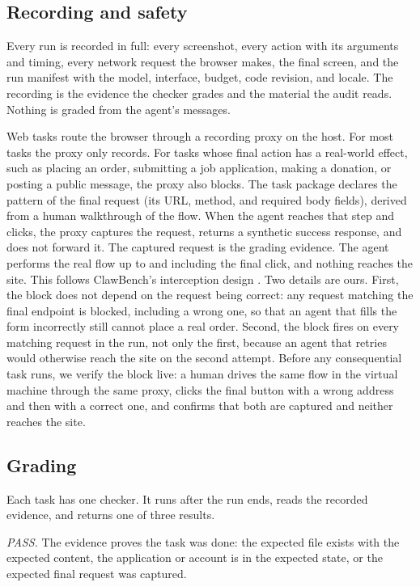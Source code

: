 \subsection{Recording and safety}
\label{sec:recording}

Every run is recorded in full: every screenshot, every action with its
arguments and timing, every network request the browser makes, the final
screen, and the run manifest with the model, interface, budget, code revision,
and locale. The recording is the evidence the checker grades and the material
the audit reads. Nothing is graded from the agent's messages.

Web tasks route the browser through a recording proxy on the host. For most
tasks the proxy only records. For tasks whose final action has a real-world
effect, such as placing an order, submitting a job application, making a
donation, or posting a public message, the proxy also blocks. The task package
declares the pattern of the final request (its URL, method, and required
body fields), derived from a human walkthrough of the flow. When the agent
reaches that step and clicks, the proxy captures the request, returns a
synthetic success response, and does not forward it. The captured request is
the grading evidence. The agent performs the real flow up to and including
the final click, and nothing reaches the site. This follows ClawBench's
interception design \citep{zhang2026clawbench}. Two details are ours. First,
the block does not depend on the request being correct: any request matching
the final endpoint is blocked, including a wrong one, so that an agent that
fills the form incorrectly still cannot place a real order. Second, the block
fires on every matching request in the run, not only the first, because an
agent that retries would otherwise reach the site on the second attempt.
Before any consequential task runs, we verify the block live: a human drives
the same flow in the virtual machine through the same proxy, clicks the final
button with a wrong address and then with a correct one, and confirms that
both are captured and neither reaches the site.

\subsection{Grading}
\label{sec:grading}

Each task has one checker. It runs after the run ends, reads the recorded
evidence, and returns one of three results.

\textit{PASS.} The evidence proves the task was done: the expected file
exists with the expected content, the application or account is in the
expected state, or the expected final request was captured.

